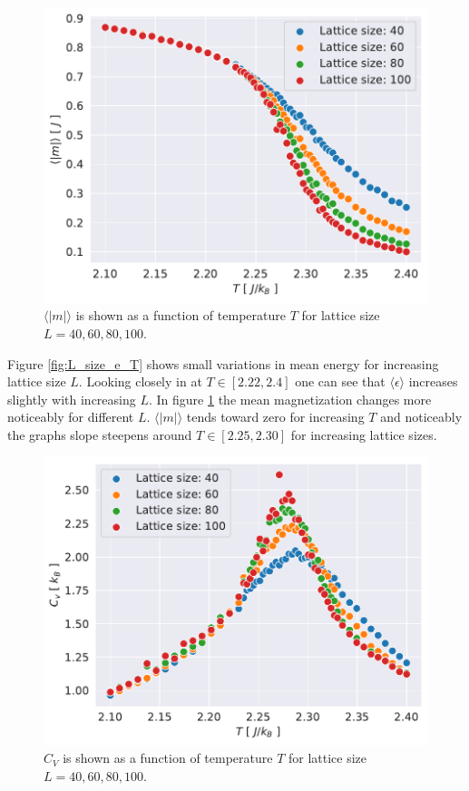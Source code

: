 \documentclass[english,notitlepage,reprint,nofootinbib]{revtex4-1}  %
\begin{document}
\begin{figure}[H]
    \centering
    \includegraphics[width=.5\textwidth]{../figures/L_size_m_T.pdf}
    \caption{$\langle |m| \rangle$ is shown as a function of temperature $T$ for lattice size $L= 40, 60,80,100$.}
    \label{fig:L_size_m_T}
\end{figure}
Figure \ref{fig:L_size_e_T} shows small variations in mean energy for increasing lattice size $L$. Looking closely in at $T \in [2.22,2.4]$ one can see that $\langle \epsilon \rangle$ increases slightly with increasing $L$. In figure \ref{fig:L_size_m_T} the mean magnetization changes more noticeably for different $L$. $\langle |m| \rangle$ tends toward zero for increasing $T$ and noticeably the graphs slope steepens around $T \in [2.25,2.30]$ for increasing lattice sizes.

\begin{figure}[H]
    \centering
    \includegraphics[width=.5\textwidth]{../figures/L_size_c_v_T.pdf}
    \caption{$C_V$ is shown as a function of temperature $T$ for lattice size $L= 40, 60,80,100$.}
    \label{fig:L_size_c_v_T}
\end{figure}
\end{document}
